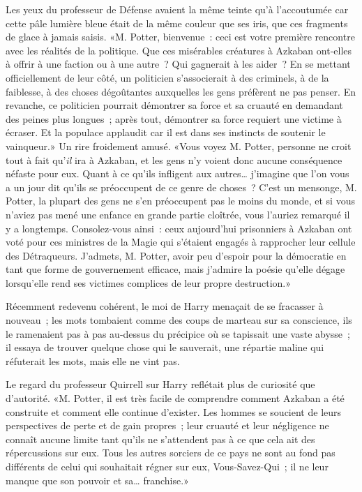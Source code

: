 Les yeux du professeur de Défense avaient la même teinte qu'à l'accoutumée car cette pâle lumière bleue était de la même couleur que ses iris, que ces fragments de glace à jamais saisis. «M. Potter, bienvenue~: ceci est votre première rencontre avec les réalités de la politique. Que ces misérables créatures à Azkaban ont-elles à offrir à une faction ou à une autre~? Qui gagnerait à les aider~? En se mettant officiellement de leur côté, un politicien s'associerait à des criminels, à de la faiblesse, à des choses dégoûtantes auxquelles les gens préfèrent ne pas penser. En revanche, ce politicien pourrait démontrer sa force et sa cruauté en demandant des peines plus longues~; après tout, démontrer sa force requiert une victime à écraser. Et la populace applaudit car il est dans ses instincts de soutenir le vainqueur.» Un rire froidement amusé. «Vous voyez M. Potter, personne ne croit tout à fait qu'\emph{il} ira à Azkaban, et les gens n'y voient donc aucune conséquence néfaste pour eux. Quant à ce qu'ils infligent aux autres… j'imagine que l'on vous a un jour dit qu'ils se préoccupent de ce genre de choses~? C'est un mensonge, M. Potter, la plupart des gens ne s'en préoccupent pas le moins du monde, et si vous n'aviez pas mené une enfance en grande partie cloîtrée, vous l'auriez remarqué il y a longtemps. Consolez-vous ainsi~: ceux aujourd'hui prisonniers à Azkaban ont voté pour ces ministres de la Magie qui s'étaient engagés à rapprocher leur cellule des Détraqueurs. J'admets, M. Potter, avoir peu d'espoir pour la démocratie en tant que forme de gouvernement efficace, mais j'admire la poésie qu'elle dégage lorsqu'elle rend ses victimes complices de leur propre destruction.»

Récemment redevenu cohérent, le moi de Harry menaçait de se fracasser à nouveau~; les mots tombaient comme des coups de marteau sur sa conscience, ils le ramenaient pas à pas au-dessus du précipice où se tapissait une vaste abysse~; il essaya de trouver quelque chose qui le sauverait, une répartie maline qui réfuterait les mots, mais elle ne vint pas.

Le regard du professeur Quirrell sur Harry reflétait plus de curiosité que d'autorité. «M. Potter, il est très facile de comprendre comment Azkaban a été construite et comment elle continue d'exister. Les hommes se soucient de leurs perspectives de perte et de gain propres~; leur cruauté et leur négligence ne connaît aucune limite tant qu'ils ne s'attendent pas à ce que cela ait des répercussions sur eux. Tous les autres sorciers de ce pays ne sont au fond pas différents de celui qui souhaitait régner sur eux, Vous-Savez-Qui~; il ne leur manque que son pouvoir et sa… franchise.»

